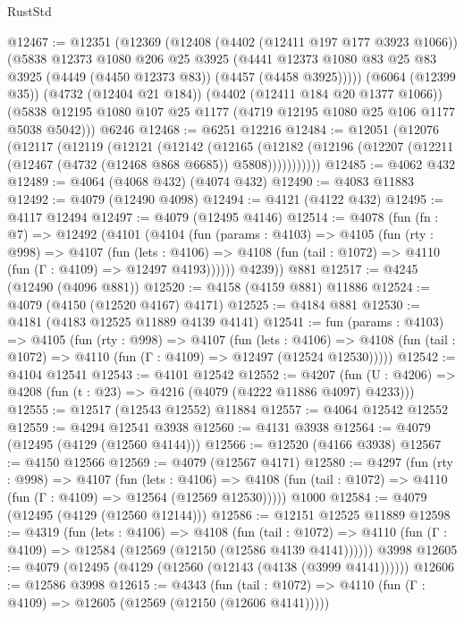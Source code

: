 \begin{lexlean}{RustStd}
\begin{coremodule}
{\begin{coremodule}
{{{{{{{{{{{{{{@12467 := @12351
    (@12369
      (@12408
        (@4402 (@12411 @197 @177 @3923 @1066))
        (@5838
          @12373
          @1080
          @206
          @25
          @3925
          (@4441 @12373 @1080 @83 @25 @83 @3925 (@4449 (@4450 @12373 @83)) (@4457 (@4458 @3925)))))
      (@6064 (@12399 @35))
      (@4732 (@12404 @21 @184))
      (@4402 (@12411 @184 @20 @1377 @1066))
      (@5838 @12195 @1080 @107 @25 @1177 (@4719 @12195 @1080 @25 @106 @1177 @5038 @5042)))
    @6246
@12468 := @6251 @12216
@12484 := @12051
    (@12076
      (@12117
        (@12119
          (@12121
            (@12142
              (@12165
                (@12182 (@12196 (@12207 (@12211 (@12467 (@4732 (@12468 @868 @6685)) @5808)))))))))))
@12485 := @4062 @432
@12489 := @4064 (@4068 @432) (@4074 @432)
@12490 := @4083 @11883
@12492 := @4079 (@12490 @4098)
@12494 := @4121 (@4122 @432)
@12495 := @4117 @12494
@12497 := @4079 (@12495 @4146)
@12514 := @4078
    (fun (fn : @7) =>
    @12492
      (@4101
        (@4104
          (fun (params : @4103) =>
          @4105
            (fun (rty : @998) =>
            @4107
              (fun (lets : @4106) =>
              @4108 (fun (tail : @1072) => @4110 (fun (Γ : @4109) => @12497 @4193))))))
        @4239))
    @881
@12517 := @4245 (@12490 (@4096 @881))
@12520 := @4158 (@4159 @881) @11886
@12524 := @4079 (@4150 (@12520 @4167) @4171)
@12525 := @4184 @881
@12530 := @4181 (@4183 @12525 @11889 @4139 @4141)
@12541 := fun (params : @4103) =>
  @4105
    (fun (rty : @998) =>
    @4107
      (fun (lets : @4106) =>
      @4108 (fun (tail : @1072) => @4110 (fun (Γ : @4109) => @12497 (@12524 @12530)))))
@12542 := @4104 @12541
@12543 := @4101 @12542
@12552 := @4207
    (fun (U : @4206) => @4208 (fun (t : @23) => @4216 (@4079 (@4222 @11886 @4097) @4233)))
@12555 := @12517 (@12543 @12552) @11884
@12557 := @4064 @12542 @12552
@12559 := @4294 @12541 @3938
@12560 := @4131 @3938
@12564 := @4079 (@12495 (@4129 (@12560 @4144)))
@12566 := @12520 (@4166 @3938)
@12567 := @4150 @12566
@12569 := @4079 (@12567 @4171)
@12580 := @4297
    (fun (rty : @998) =>
    @4107
      (fun (lets : @4106) =>
      @4108 (fun (tail : @1072) => @4110 (fun (Γ : @4109) => @12564 (@12569 @12530)))))
    @1000
@12584 := @4079 (@12495 (@4129 (@12560 @12144)))
@12586 := @12151 @12525 @11889
@12598 := @4319
    (fun (lets : @4106) =>
    @4108
      (fun (tail : @1072) =>
      @4110 (fun (Γ : @4109) => @12584 (@12569 (@12150 (@12586 @4139 @4141))))))
    @3998
@12605 := @4079 (@12495 (@4129 (@12560 (@12143 (@4138 (@3999 @4141))))))
@12606 := @12586 @3998
@12615 := @4343
    (fun (tail : @1072) => @4110 (fun (Γ : @4109) => @12605 (@12569 (@12150 (@12606 @4141)))))
}}}}}}}}}}}}}}
\end{coremodule}}
\end{coremodule}
\end{lexlean}
